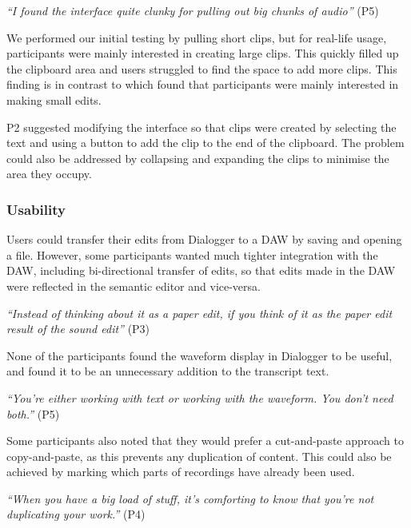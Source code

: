 \textit{``I found the interface quite clunky for pulling out big chunks of audio''} (P5)

We performed our initial testing by pulling short clips, but for real-life usage, participants were mainly interested
in creating large clips. This quickly filled up the clipboard area and users struggled to find the space to add more
clips. This finding is in contrast to \citet{Sivaraman2016} which found that participants were mainly interested in
making small edits.

P2 suggested modifying the interface so that clips were created by selecting the text and using a button to add the
clip to the end of the clipboard. The problem could also be addressed by collapsing and expanding the clips to minimise
the area they occupy.


\subsubsection{Usability}

Users could transfer their edits from Dialogger to a DAW by saving and opening a file. However, some
participants wanted much tighter integration with the DAW, including bi-directional transfer of edits, so that edits
made in the DAW were reflected in the semantic editor and vice-versa.

\textit{``Instead of thinking about it as a paper edit, if you think of it as the paper edit result of the sound
  edit''} (P3)

None of the participants found the waveform display in Dialogger to be useful, and found it to be an
unnecessary addition to the transcript text.

\textit{``You're either working with text or working with the waveform. You don't need both.''} (P5)

Some participants also noted that they would prefer a cut-and-paste approach to copy-and-paste, as this prevents any
duplication of content. This could also be achieved by marking which parts of recordings have already been used.

\textit{``When you have a big load of stuff, it's comforting to know that you're not duplicating your work.''} (P4)


